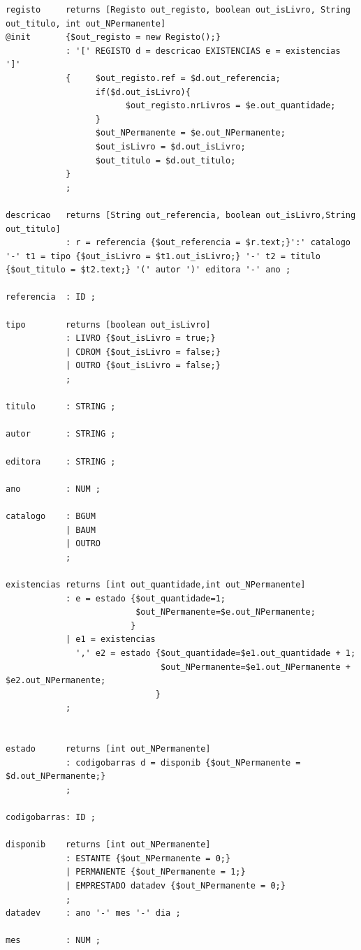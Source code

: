 \begin{verbatim}
registo     returns [Registo out_registo, boolean out_isLivro, String out_titulo, int out_NPermanente]
@init       {$out_registo = new Registo();}
            : '[' REGISTO d = descricao EXISTENCIAS e = existencias ']'
            {     $out_registo.ref = $d.out_referencia;
                  if($d.out_isLivro){
                        $out_registo.nrLivros = $e.out_quantidade;
                  }
                  $out_NPermanente = $e.out_NPermanente;
                  $out_isLivro = $d.out_isLivro;
                  $out_titulo = $d.out_titulo;
            }
            ;

descricao   returns [String out_referencia, boolean out_isLivro,String out_titulo]
            : r = referencia {$out_referencia = $r.text;}':' catalogo '-' t1 = tipo {$out_isLivro = $t1.out_isLivro;} '-' t2 = titulo {$out_titulo = $t2.text;} '(' autor ')' editora '-' ano ;

referencia  : ID ;

tipo        returns [boolean out_isLivro]
            : LIVRO {$out_isLivro = true;}
            | CDROM {$out_isLivro = false;}
            | OUTRO {$out_isLivro = false;}
            ;

titulo      : STRING ;

autor       : STRING ;

editora     : STRING ;

ano         : NUM ;

catalogo    : BGUM
            | BAUM
            | OUTRO
            ;

existencias returns [int out_quantidade,int out_NPermanente]
            : e = estado {$out_quantidade=1;
                          $out_NPermanente=$e.out_NPermanente;
                         }
            | e1 = existencias
              ',' e2 = estado {$out_quantidade=$e1.out_quantidade + 1;
                               $out_NPermanente=$e1.out_NPermanente + $e2.out_NPermanente;
                              }
            ;


estado      returns [int out_NPermanente]
            : codigobarras d = disponib {$out_NPermanente = $d.out_NPermanente;}
            ;

codigobarras: ID ;

disponib    returns [int out_NPermanente]
            : ESTANTE {$out_NPermanente = 0;}
            | PERMANENTE {$out_NPermanente = 1;}
            | EMPRESTADO datadev {$out_NPermanente = 0;}
            ;
datadev     : ano '-' mes '-' dia ;

mes         : NUM ;


\end{verbatim}
